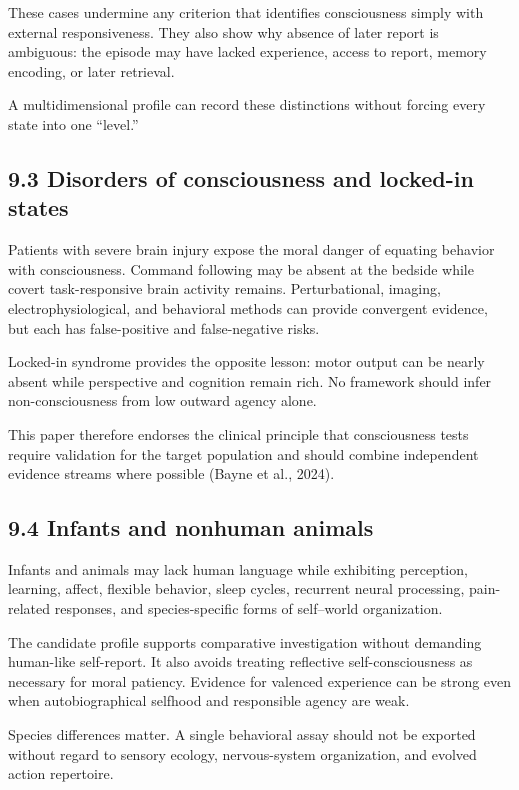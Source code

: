 \documentclass[
  11pt,
]{article}
\begin{document}
These cases undermine any criterion that identifies consciousness simply
with external responsiveness. They also show why absence of later report
is ambiguous: the episode may have lacked experience, access to report,
memory encoding, or later retrieval.

A multidimensional profile can record these distinctions without forcing
every state into one ``level.''

\subsection{9.3 Disorders of consciousness and locked-in
states}\label{disorders-of-consciousness-and-locked-in-states}

Patients with severe brain injury expose the moral danger of equating
behavior with consciousness. Command following may be absent at the
bedside while covert task-responsive brain activity remains.
Perturbational, imaging, electrophysiological, and behavioral methods
can provide convergent evidence, but each has false-positive and
false-negative risks.

Locked-in syndrome provides the opposite lesson: motor output can be
nearly absent while perspective and cognition remain rich. No framework
should infer non-consciousness from low outward agency alone.

This paper therefore endorses the clinical principle that consciousness
tests require validation for the target population and should combine
independent evidence streams where possible (Bayne et al., 2024).

\subsection{9.4 Infants and nonhuman
animals}\label{infants-and-nonhuman-animals}

Infants and animals may lack human language while exhibiting perception,
learning, affect, flexible behavior, sleep cycles, recurrent neural
processing, pain-related responses, and species-specific forms of
self--world organization.

The candidate profile supports comparative investigation without
demanding human-like self-report. It also avoids treating reflective
self-consciousness as necessary for moral patiency. Evidence for
valenced experience can be strong even when autobiographical selfhood
and responsible agency are weak.

Species differences matter. A single behavioral assay should not be
exported without regard to sensory ecology, nervous-system organization,
and evolved action repertoire.
\end{document}
